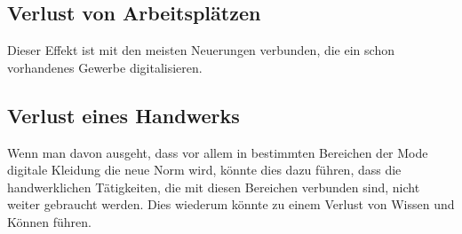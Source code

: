 \documentclass{article}
\begin{document}
\subsection{Verlust von Arbeitsplätzen}
Dieser Effekt ist mit den meisten Neuerungen verbunden, die ein schon vorhandenes Gewerbe digitalisieren.

\subsection{Verlust eines Handwerks}
Wenn man davon ausgeht, dass vor allem in bestimmten Bereichen der Mode digitale Kleidung die neue Norm wird, könnte dies dazu führen, dass die handwerklichen Tätigkeiten, die mit diesen Bereichen verbunden sind, nicht weiter gebraucht werden. Dies wiederum könnte zu einem Verlust von Wissen und Können führen.

\newpage
\end{document}
